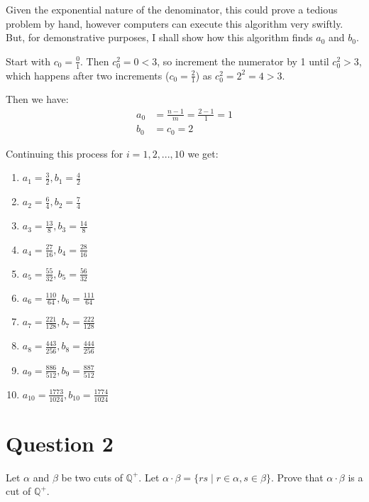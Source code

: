 \documentclass[12pt, letterpaper]{article}
\begin{document}
\noindent Given the exponential nature of the denominator, this could prove a tedious problem by hand, however computers can execute this algorithm very swiftly.
But, for demonstrative purposes, I shall show how this algorithm finds $a_0$ and $b_0$.

Start with $c_0 = \frac{0}{1}$. Then $c_0^2 = 0 < 3$, so increment the numerator by 1 until $c_0^2 > 3$, which happens after two increments ($c_0 = \frac{2}{1}$) as $c_0^2 = 2^2 = 4 > 3$.

\noindent Then we have:
\begin{equation}
\begin{split}
a_0 & = \frac{n - 1}{m} = \frac{2 - 1}{1} = 1 \\
b_0 & = c_0 = 2
\end{split}
\end{equation}

\noindent Continuing this process for $i = 1, 2, ..., 10$ we get:
\begin{enumerate}
  \item $a_1 = \frac{3}{2}, b_1 = \frac{4}{2}$
  \item $a_2 = \frac{6}{4}, b_2 = \frac{7}{4}$
  \item $a_3 = \frac{13}{8}, b_3 = \frac{14}{8}$
  \item $a_4 = \frac{27}{16}, b_4 = \frac{28}{16}$
  \item $a_5 = \frac{55}{32}, b_5 = \frac{56}{32}$
  \item $a_6 = \frac{110}{64}, b_6 = \frac{111}{64}$
  \item $a_7 = \frac{221}{128}, b_7 = \frac{222}{128}$
  \item $a_8 = \frac{443}{256}, b_8 = \frac{444}{256}$
  \item $a_9 = \frac{886}{512}, b_9 = \frac{887}{512}$
  \item $a_{10} = \frac{1773}{1024}, b_{10} = \frac{1774}{1024}$
\end{enumerate}
\pagebreak
\section{Question 2}
Let $\alpha$ and $\beta$ be two cuts of $\mathbb{Q}^+$. Let $\alpha \cdot \beta = \{ rs \mid r \in \alpha, s \in \beta \}$. Prove that $\alpha \cdot \beta$ is a cut of $\mathbb{Q}^+$.
\end{document}
